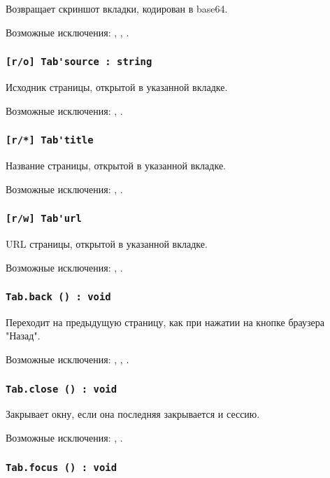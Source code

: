 Возвращает скриншот вкладки, кодирован в base64.

Возможные исключения: , , .

\subsubsection{\lstinline|[r/o] Tab'source : string|}

Исходник страницы, открытой в указанной вкладке.

Возможные исключения: , .

\subsubsection{\lstinline|[r/*] Tab'title|}

Название страницы, открытой в указанной вкладке.

Возможные исключения: , .

\subsubsection{\lstinline|[r/w] Tab'url|}

URL страницы, открытой в указанной вкладке.

Возможные исключения: , .

\subsubsection{\lstinline|Tab.back () : void|}

Переходит на предыдущую страницу, как при нажатии на кнопке браузера "Назад".

Возможные исключения: , , .

\subsubsection{\lstinline|Tab.close () : void|}

Закрывает окну, если она последняя закрывается и сессию.

Возможные исключения: , .

\subsubsection{\lstinline|Tab.focus () : void|}

